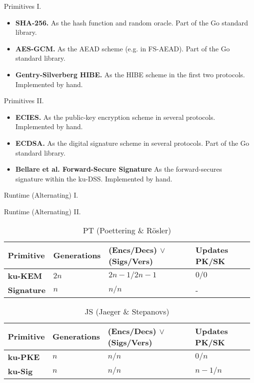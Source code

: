 \documentclass{beamer}
\begin{document}
\begin{frame}{Primitives I.}
  \begin{itemize}
  \item \textbf{SHA-256.} As the hash function and random oracle. Part of
    the Go standard library.
  \item \textbf{AES-GCM.} As the AEAD scheme (e.g. in FS-AEAD). Part of
    the Go standard library.
  \item \textbf{Gentry-Silverberg HIBE.} As the HIBE scheme in the first
    two protocols. Implemented by hand.
  \end{itemize}
\end{frame}

\begin{frame}{Primitives II.}
  \begin{itemize}
   \item \textbf{ECIES.} As the public-key encryption scheme in several protocols.
    Implemented by hand.
  \item \textbf{ECDSA.} As the digital signature scheme in several protocols.
    Part of the Go standard library.
  \item \textbf{Bellare et al. Forward-Secure Signature} As the forward-secures
    signature within the ku-DSS. Implemented by hand.
  \end{itemize}
\end{frame}

\begin{frame}{Runtime (Alternating) I.}
  \begin{figure}[H]
    \centering
     
  \end{figure}
\end{frame}

\begin{frame}{Runtime (Alternating) II.}
  \scriptsize
  \begin{table}
    \caption*{PT (Poettering \& Rösler)}
    \begin{tabular}{ | l | l | l | l |}
      \hline
      Primitive & Generations & (Encs/Decs) $\vee$ (Sigs/Vers) & Updates PK/SK \\ \hline
      \textbf{ku-KEM} & $2n$ & $2n-1/2n-1$ & $0/0$ \\ \hline
      \textbf{Signature} & $n$ & $n/n$ & - \\  
        \hline
    \end{tabular}
  \end{table}
  \begin{table}
    \caption*{JS (Jaeger \& Stepanovs)}
    \begin{tabular}{ | l | l | l | l |}
    \hline
    Primitive & Generations & (Encs/Decs) $\vee$ (Sigs/Vers) & Updates PK/SK \\ \hline
    \textbf{ku-PKE} & $n$ & $n/n$ & $0/n$ \\ \hline
    \textbf{ku-Sig} & $n$ & $n/n$ & $n-1/n$ \\  
    \hline
    \end{tabular}
  \end{table}
\end{frame}
\end{document}
